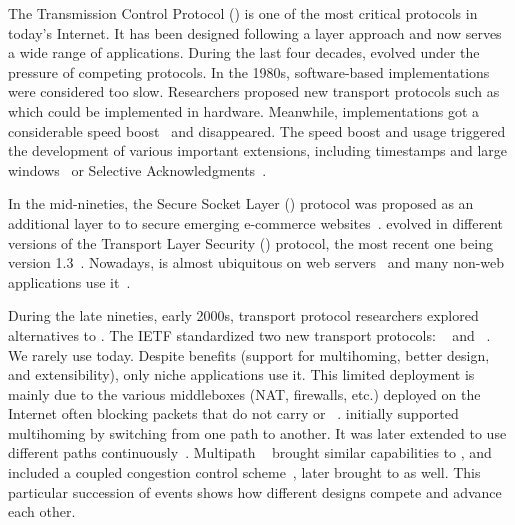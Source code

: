 The Transmission Control Protocol (\tcp) \cite{rfc793} is one of the most
critical protocols in today's Internet. It has been designed following a
layer approach and now serves a wide range of applications. During the last four decades, \tcp evolved under the pressure of competing protocols. In the 1980s, software-based \tcp implementations were considered too slow. Researchers proposed new transport protocols such as \xtp~\cite{sanders1990xpress} which could be implemented in hardware. Meanwhile, \tcp implementations got a considerable speed boost~\cite{clark1989analysis} and \xtp disappeared. The \tcp speed boost and
usage triggered the development of various important \tcp extensions, including timestamps and large windows~\cite{rfc1323} or Selective Acknowledgments~\cite{rfc2018}.

In the mid-nineties, the Secure Socket Layer (\ssl) protocol was proposed as an
additional layer to \tcp to secure emerging e-commerce
websites~\cite{draft-hickman-netscape-ssl}. \ssl evolved in different versions
of the Transport Layer Security (\tls) protocol, the most recent one being
version 1.3~\cite{rfc8446}. %
Nowadays, \tls is almost ubiquitous on web servers~\cite{holz2019era} and many
non-web applications use it~\cite{anderson2019tls}.

During the late nineties, early 2000s, transport protocol researchers explored
alternatives to \tcp. The IETF standardized two new transport protocols:
\dccp~\cite{kohler2006designing} and \sctp~\cite{rfc4960}. We rarely use \dccp
today. Despite \sctp benefits (support for multihoming, better design, and
extensibility), only niche applications use it. %
This limited deployment is mainly due to the various middleboxes (NAT,
firewalls, etc.) deployed on
the Internet often blocking packets that do not carry \tcp or
\udp~\cite{honda2011still}.  \sctp initially supported multihoming by switching
from one path to another. It was later extended to use different
paths continuously~\cite{iyengar2006concurrent}. Multipath
\tcp~\cite{rfc6824,raiciu2012hard} brought similar capabilities to \tcp, and
included a coupled congestion control scheme~\cite{wischik2011design}, later
brought to \sctp as well. This particular succession of events shows how
different designs compete and advance each other.

